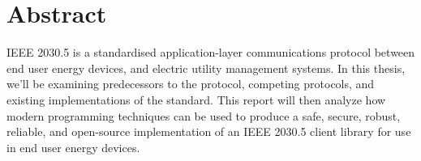 \chapter*{Abstract}\label{abstract}
IEEE 2030.5 is a standardised application-layer communications protocol between end user energy devices, and electric utility management systems.
In this thesis, we'll be examining predecessors to the protocol, competing protocols, and existing implementations of the standard.
This report will then analyze how modern programming techniques can be used to produce a safe, secure, robust, reliable, and open-source implementation of an IEEE 2030.5 client library for use in end user energy devices.
